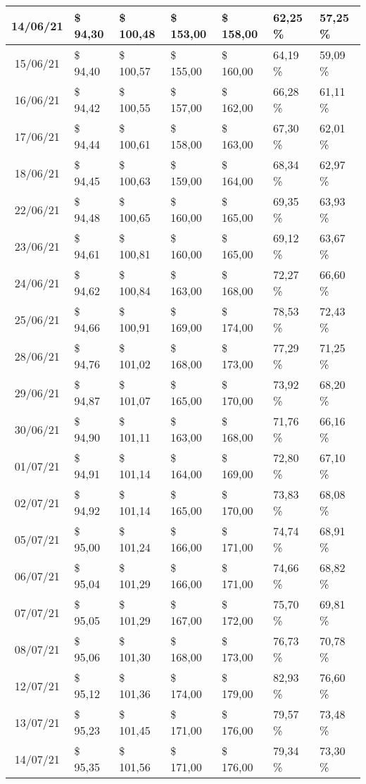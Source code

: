 \begin{center}
\begin{longtable}{|c|p{1.5cm}|p{1.5cm}|p{1.5cm}|p{1.5cm}|p{1.5cm}|p{1.5cm}|}
14/06/21 & \$ 94,30 & \$ 100,48 & \$ 153,00 & \$ 158,00 & 62,25 \% & 57,25 \% \\ \hline
15/06/21 & \$ 94,40 & \$ 100,57 & \$ 155,00 & \$ 160,00 & 64,19 \% & 59,09 \% \\ \hline
16/06/21 & \$ 94,42 & \$ 100,55 & \$ 157,00 & \$ 162,00 & 66,28 \% & 61,11 \% \\ \hline
17/06/21 & \$ 94,44 & \$ 100,61 & \$ 158,00 & \$ 163,00 & 67,30 \% & 62,01 \% \\ \hline
18/06/21 & \$ 94,45 & \$ 100,63 & \$ 159,00 & \$ 164,00 & 68,34 \% & 62,97 \% \\ \hline
22/06/21 & \$ 94,48 & \$ 100,65 & \$ 160,00 & \$ 165,00 & 69,35 \% & 63,93 \% \\ \hline
23/06/21 & \$ 94,61 & \$ 100,81 & \$ 160,00 & \$ 165,00 & 69,12 \% & 63,67 \% \\ \hline
24/06/21 & \$ 94,62 & \$ 100,84 & \$ 163,00 & \$ 168,00 & 72,27 \% & 66,60 \% \\ \hline
25/06/21 & \$ 94,66 & \$ 100,91 & \$ 169,00 & \$ 174,00 & 78,53 \% & 72,43 \% \\ \hline
28/06/21 & \$ 94,76 & \$ 101,02 & \$ 168,00 & \$ 173,00 & 77,29 \% & 71,25 \% \\ \hline
29/06/21 & \$ 94,87 & \$ 101,07 & \$ 165,00 & \$ 170,00 & 73,92 \% & 68,20 \% \\ \hline
30/06/21 & \$ 94,90 & \$ 101,11 & \$ 163,00 & \$ 168,00 & 71,76 \% & 66,16 \% \\ \hline
01/07/21 & \$ 94,91 & \$ 101,14 & \$ 164,00 & \$ 169,00 & 72,80 \% & 67,10 \% \\ \hline
02/07/21 & \$ 94,92 & \$ 101,14 & \$ 165,00 & \$ 170,00 & 73,83 \% & 68,08 \% \\ \hline
05/07/21 & \$ 95,00 & \$ 101,24 & \$ 166,00 & \$ 171,00 & 74,74 \% & 68,91 \% \\ \hline
06/07/21 & \$ 95,04 & \$ 101,29 & \$ 166,00 & \$ 171,00 & 74,66 \% & 68,82 \% \\ \hline
07/07/21 & \$ 95,05 & \$ 101,29 & \$ 167,00 & \$ 172,00 & 75,70 \% & 69,81 \% \\ \hline
08/07/21 & \$ 95,06 & \$ 101,30 & \$ 168,00 & \$ 173,00 & 76,73 \% & 70,78 \% \\ \hline
12/07/21 & \$ 95,12 & \$ 101,36 & \$ 174,00 & \$ 179,00 & 82,93 \% & 76,60 \% \\ \hline
13/07/21 & \$ 95,23 & \$ 101,45 & \$ 171,00 & \$ 176,00 & 79,57 \% & 73,48 \% \\ \hline
14/07/21 & \$ 95,35 & \$ 101,56 & \$ 171,00 & \$ 176,00 & 79,34 \% & 73,30 \% \\ \hline

\end{longtable}
\end{center}
